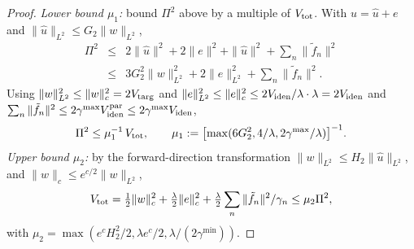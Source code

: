 \documentclass[journal,twoside,web]{ieeecolor}
\begin{document}
\begin{proof}
\emph{Lower bound $\mu_1$:} bound $\Pi^2$ above by a multiple of $V_{\rm tot}$. With $u=\hat u+e$ and $\|\hat u\|_{L^2}\le G_2\|w\|_{L^2}$,
\begin{eqnarray}
\Pi^2 &\le& 2\|\hat u\|^2+2\|e\|^2+\|\hat u\|^2+\sum_n\|\tilde f_n\|^2 \nonumber\\
&\le& 3G_2^2\|w\|_{L^2}^2+2\|e\|_{L^2}^2+\sum_n\|\tilde f_n\|^2. \label{eq:Pi-up}
\end{eqnarray}
Using $\|w\|_{L^2}^2\le\|w\|_c^2=2V_{\rm targ}$ and $\|e\|_{L^2}^2\le\|e\|_c^2\le 2V_{\rm iden}/\lambda\cdot\lambda=2V_{\rm iden}$ and $\sum_n\|\tilde f_n\|^2\le 2\gamma^{\max}V^{\rm par}_{\rm iden}\le 2\gamma^{\max}V_{\rm iden}$,
\begin{equation}\label{eq:Pi-up2}
\Pi^2\le \mu_1^{-1}\,V_{\rm tot},\qquad \mu_1:=\bigl[\max(6G_2^2,4/\lambda,2\gamma^{\max}/\lambda)\bigr]^{-1}.
\end{equation}
\emph{Upper bound $\mu_2$:} by the forward-direction transformation $\|w\|_{L^2}\le H_2\|\hat u\|_{L^2}$, and $\|w\|_c\le e^{c/2}\|w\|_{L^2}$,
\begin{equation}\label{eq:U-up}
V_{\rm tot}=\tfrac12\|w\|_c^2+\tfrac{\lambda}{2}\|e\|_c^2+\tfrac{\lambda}{2}\sum_n\|\tilde f_n\|^2/\gamma_n\le \mu_2\Pi^2,
\end{equation}
with $\mu_2=\max(e^c H_2^2/2,\lambda e^c/2,\lambda/(2\gamma^{\min}))$.
\end{proof}
\end{document}
